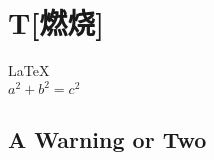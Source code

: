 \documentclass{ctexart}
\begin{document}
               
 
\section{T[燃烧]}          
\LaTeX \,\\ 
 $a^2+b^2=c^2$

\subsection{A Warning or Two}  

\end{document}
